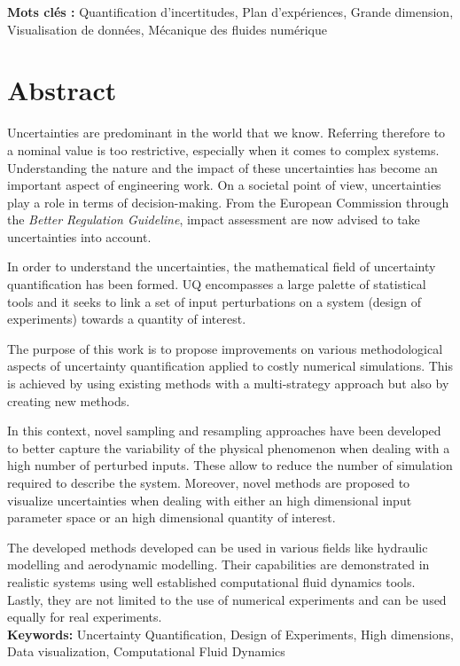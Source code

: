 \textbf{Mots clés :} Quantification d'incertitudes, Plan d'expériences, Grande dimension, Visualisation de données, Mécanique des fluides numérique %


\chapter*{Abstract}

Uncertainties are predominant in the world that we know. Referring therefore to a nominal value is too restrictive, especially when it comes to complex systems. Understanding the nature and the impact of these uncertainties has become an important aspect of engineering work. On a societal point of view, uncertainties play a role in terms of decision-making. From the European Commission through the \emph{Better Regulation Guideline}, impact assessment are now advised to take uncertainties into account.

In order to understand the uncertainties, the mathematical field of uncertainty quantification has been formed. UQ encompasses a large palette of statistical tools and it seeks to link a set of input perturbations on a system (design of experiments) towards a quantity of interest.

The purpose of this work is to propose improvements on various methodological aspects of uncertainty quantification applied to costly numerical simulations. This is achieved by using existing methods with a multi-strategy approach but also by creating new methods. 



In this context, novel sampling and resampling approaches have been developed to better capture the variability of the physical phenomenon when dealing with a high number of perturbed inputs. These allow to reduce the number of simulation required to describe the system. Moreover, novel methods are proposed to visualize uncertainties when dealing with either an high dimensional input parameter space or an high dimensional quantity of interest.

The developed methods developed can be used in various fields like hydraulic modelling and aerodynamic modelling. Their capabilities are demonstrated in realistic systems using well established computational fluid dynamics tools. Lastly, they are not limited to the use of numerical experiments and can be used equally for real experiments.\\

\textbf{Keywords:} Uncertainty Quantification, Design of Experiments, High dimensions, Data visualization, Computational Fluid Dynamics %




